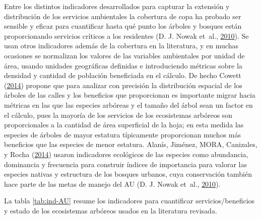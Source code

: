 \documentclass[12pt,a4paper,openany]{book}
\theoremstyle{definition}
\theoremstyle{definition}
\theoremstyle{definition}
\theoremstyle{remark}
\begin{document}
Entre los distintos indicadores desarrollados para capturar la extensión
y distribución de los servicios ambientales la cobertura de copa ha
probado ser sensible y eficaz para cuantificar hasta qué punto los
árboles y bosques están proporcionando servicios críticos a los
residentes (D. J. Nowak et~al.,
\protect\hyperlink{ref-nowak_sustaining_2010}{2010}). Se usan otros
indicadores además de la cobertura en la literatura, y en muchas
ocasiones se normalizan los valores de las variables ambientales por
unidad de área, usando unidades geográficas definidas e introduciendo
métricas sobre la densidad y cantidad de población beneficiada en el
cálculo. De hecho Cowett
(\protect\hyperlink{ref-cowett_methodology_2014}{2014}) propone que para
analizar con precisión la distribución espacial de los árboles de las
calles y los beneficios que proporcionan es importante migrar hacia
métricas en las que las especies arbóreas y el tamaño del árbol sean un
factor en el cálculo, pues la mayoría de los servicios de los
ecosistemas arbóreos son proporcionales a la cantidad de área
superficial de la hoja; en esta medida las especies de árboles de mayor
estatura típicamente proporcionan muchos más beneficios que las especies
de menor estatura. Alanís, Jiménez, MORA, Canizales, y Rocha
(\protect\hyperlink{ref-alanis_estructura_2014}{2014}) usaron
indicadores ecológicos de las especies como abundancia, dominancia y
frecuencia para construir índices de importancia para valorar las
especies nativas y estructura de los bosques urbanos, cuya conservación
también hace parte de las metas de manejo del AU (D. J. Nowak et~al.,
\protect\hyperlink{ref-nowak_sustaining_2010}{2010}).

La tabla \ref{tab:ind-AU} resume los indicadores para cuantificar
servicios/beneficios y estado de los ecosistemas arbóreos usados en la
literatura revisada.
\end{document}
